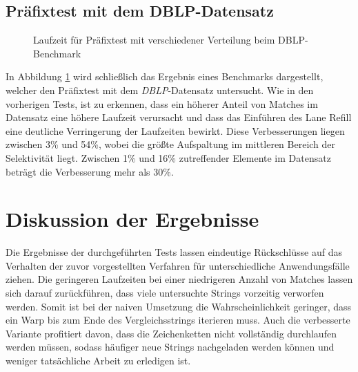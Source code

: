 \subsection{Präfixtest mit dem DBLP-Datensatz}

\begin{figure}[ht]
	\centering
	\caption{Laufzeit für Präfixtest mit verschiedener Verteilung beim DBLP-Benchmark}
\label{fig:dblp_prefix}
\end{figure}

In Abbildung \ref{fig:dblp_prefix} wird schließlich das Ergebnis eines Benchmarks dargestellt, welcher den Präfixtest mit dem \emph{DBLP}-Datensatz untersucht.
Wie in den vorherigen Tests, ist zu erkennen, dass ein höherer Anteil von Matches im Datensatz eine höhere Laufzeit verursacht und dass das Einführen des Lane Refill eine deutliche Verringerung der Laufzeiten bewirkt.
Diese Verbesserungen liegen zwischen 3\% und 54\%, wobei die größte Aufspaltung im mittleren Bereich der Selektivität liegt.
Zwischen 1\% und 16\% zutreffender Elemente im Datensatz beträgt die Verbesserung mehr als 30\%.

\section{Diskussion der Ergebnisse}

Die Ergebnisse der durchgeführten Tests lassen eindeutige Rückschlüsse auf das Verhalten der zuvor vorgestellten Verfahren für unterschiedliche Anwendungsfälle ziehen.
Die geringeren Laufzeiten bei einer niedrigeren Anzahl von Matches lassen sich darauf zurückführen, dass viele untersuchte Strings vorzeitig verworfen werden.
Somit ist bei der naiven Umsetzung die Wahrscheinlichkeit geringer, dass ein Warp bis zum Ende des Vergleichsstrings iterieren muss.
Auch die verbesserte Variante profitiert davon, dass die Zeichenketten nicht vollständig durchlaufen werden müssen, sodass häufiger neue Strings nachgeladen werden können und weniger tatsächliche Arbeit zu erledigen ist.

